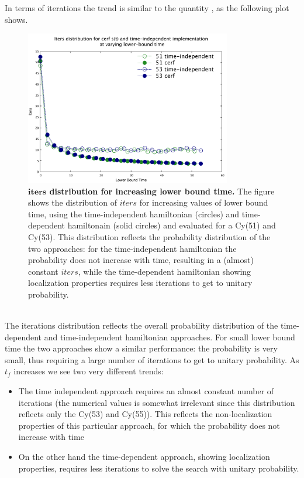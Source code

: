         In terms of iterations the trend is similar to the quantity \quantity, as the following plot shows.
        \begin{figure}[ht]
        \centering
        \includegraphics[width=90mm]{./figures/min_tp/iters.pdf}
        \caption[$iters$ distribution for increasing lower bound time.]{\textbf{$\bm{iters}$ distribution for increasing lower bound time. }The figure shows the distribution of $iters$ for increasing values of lower bound time, using the time-independent hamiltonian (circles) and time-dependent hamiltonain (solid circles) and evaluated for a Cy(51) and Cy(53). This distribution reflects the probability distribution of the two approaches: for the time-independent hamiltonian the probability does not increase with time, resulting in a (almost) constant $iters$, while the time-dependent hamiltonian showing localization properties requires less iterations to get to unitary probability.}
        \label{fig:iters_increasing_time}
        \end{figure} \\
        The iterations distribution reflects the overall probability distribution of the time-dependent and time-independent hamiltonian approaches. For small lower bound time the two approaches show a similar performance: the probability is very small, thus requiring a large number of iterations to get to unitary probability. As $t_f$ increases we see two very different trends:
        \begin{itemize}
            \item The time independent approach requires an almost constant number of iterations (the numerical values is somewhat irrelevant since this distribution reflects only the Cy(53) and Cy(55)). This reflects the non-localization properties of this particular approach, for which the probability does not increase with time
            \item On the other hand the time-dependent approach, showing localization properties, requires less iterations to solve the search with unitary probability.
        \end{itemize}

